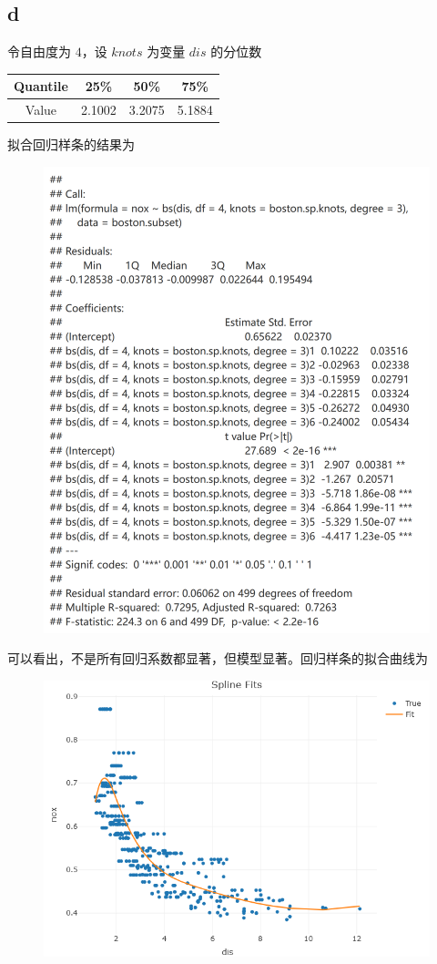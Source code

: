 \documentclass[12pt,a4paper]{article}
\begin{document}
    \subsection*{d}
    令自由度为 $4$，设 $knots$ 为变量 $dis$ 的分位数
    \begin{longtable}{c|c|c|c}
        \hline
        Quantile & 25\% & 50\% & 75\%\\
        \hline
        Value & 2.1002 & 3.2075 & 5.1884\\
        \hline
    \end{longtable}
    拟合回归样条的结果为
    \begin{figure}[H]
        \centering
        \includegraphics[scale=0.3]{RegSpline4.png}
    \end{figure}
    可以看出，不是所有回归系数都显著，但模型显著。回归样条的拟合曲线为
    \begin{figure}[H]
        \centering
        \includegraphics[scale=0.6]{RegSpline4Fit.png}
    \end{figure}
\end{document}
